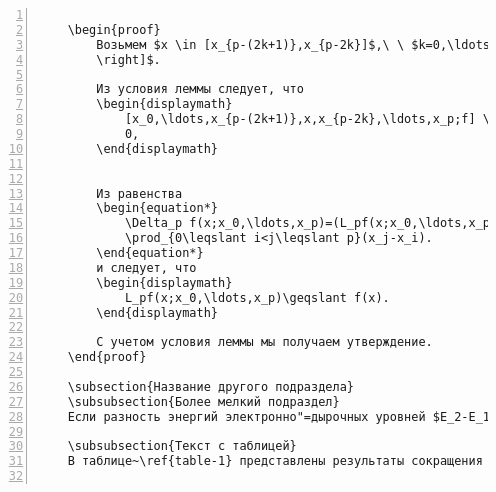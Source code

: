 \documentclass[bachelor, och, pract]{SCWorks}
\begin{document}
\begin{Verbatim}[fontsize=\small, numbers=left]
	
	\begin{proof}
		Возьмем $x \in [x_{p-(2k+1)},x_{p-2k}]$,\ \ $k=0,\ldots,\left[p/2
		\right]$.
		
		Из условия леммы следует, что
		\begin{displaymath}
			[x_0,\ldots,x_{p-(2k+1)},x,x_{p-2k},\ldots,x_p;f] \geqslant
			0,
		\end{displaymath}
		
		
		Из равенства
		\begin{equation*}
			\Delta_p f(x;x_0,\ldots,x_p)=(L_pf(x;x_0,\ldots,x_p)-f(x))
			\prod_{0\leqslant i<j\leqslant p}(x_j-x_i).
		\end{equation*}
		и следует, что
		\begin{displaymath}
			L_pf(x;x_0,\ldots,x_p)\geqslant f(x).
		\end{displaymath}
		
		С учетом условия леммы мы получаем утверждение.
	\end{proof}
	
	\subsection{Название другого подраздела}
	\subsubsection{Более мелкий подраздел}
	Если разность энергий электронно"=дырочных уровней $E_2-E_1$ близка к энергии предельного оптического фонона $\hbar\Omega_{LO}$, то в разложении волновых функций полного гамильтониана можно ограничиться нулевым приближением для всех состояний, за исключением близких по значению к $E_2$.
	
	\subsubsection{Текст с таблицей}
	В таблице~\ref{table-1} представлены результаты сокращения словарей неисправностей для схем из каталога ISCAS'89.
	

\end{Verbatim}
\end{document}
